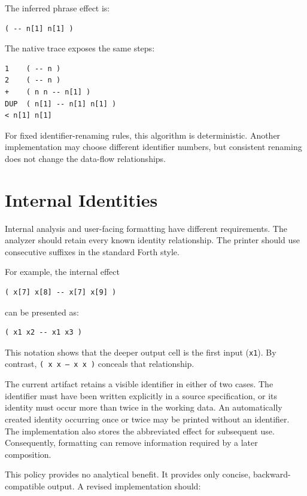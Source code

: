 \documentclass[11pt,a4paper]{article}
\newcommand{\stackeffect}[1]{\mbox{\texttt{#1}}}
\begin{document}
The inferred phrase effect is:

\begin{lstlisting}
( -- n[1] n[1] )
\end{lstlisting}

The native trace exposes the same steps:

\begin{lstlisting}
1    ( -- n )
2    ( -- n )
+    ( n n -- n[1] )
DUP  ( n[1] -- n[1] n[1] )
< n[1] n[1]
\end{lstlisting}

For fixed identifier-renaming rules, this algorithm is deterministic.  Another
implementation may choose different identifier numbers, but consistent
renaming does not change the data-flow relationships.

\section{Internal Identities}
\label{sec:indices}

Internal analysis and user-facing formatting have different requirements.
The analyzer should retain every known identity relationship.  The printer
should use consecutive suffixes in the standard Forth style.

For example, the internal effect

\begin{lstlisting}
( x[7] x[8] -- x[7] x[9] )
\end{lstlisting}

can be presented as:

\begin{lstlisting}
( x1 x2 -- x1 x3 )
\end{lstlisting}

This notation shows that the deeper output cell is the first input
(\texttt{x1}).  By contrast, \stackeffect{( x x -- x x )} conceals that
relationship.

The current artifact retains a visible identifier in either of two cases.  The
identifier must have been written explicitly in a source specification, or its
identity must occur more than twice in the working data.  An automatically
created identity occurring once or twice may be printed without an identifier.
The implementation also stores the abbreviated effect for subsequent use.
Consequently, formatting can remove information required by a later
composition.

This policy provides no analytical benefit.  It provides only concise,
backward-compatible output.  A revised implementation should:
\end{document}
